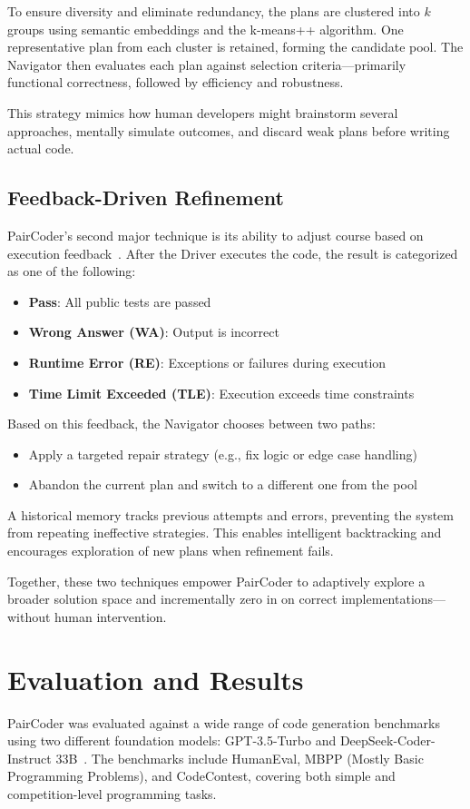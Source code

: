 \documentclass[11pt,a4paper]{article}
\begin{document}
To ensure diversity and eliminate redundancy, the plans are clustered into $k$ groups using semantic embeddings and the k-means++ algorithm. One representative plan from each cluster is retained, forming the candidate pool. The Navigator then evaluates each plan against selection criteria—primarily functional correctness, followed by efficiency and robustness.

This strategy mimics how human developers might brainstorm several approaches, mentally simulate outcomes, and discard weak plans before writing actual code.

\subsection{Feedback-Driven Refinement}
PairCoder’s second major technique is its ability to adjust course based on execution feedback~\cite{zhang2024paircoder}. After the Driver executes the code, the result is categorized as one of the following:
\begin{itemize}
\item \textbf{Pass}: All public tests are passed
\item \textbf{Wrong Answer (WA)}: Output is incorrect
\item \textbf{Runtime Error (RE)}: Exceptions or failures during execution
\item \textbf{Time Limit Exceeded (TLE)}: Execution exceeds time constraints
\end{itemize}

Based on this feedback, the Navigator chooses between two paths:
\begin{itemize}
\item Apply a targeted repair strategy (e.g., fix logic or edge case handling)
\item Abandon the current plan and switch to a different one from the pool
\end{itemize}

A historical memory tracks previous attempts and errors, preventing the system from repeating ineffective strategies. This enables intelligent backtracking and encourages exploration of new plans when refinement fails.

Together, these two techniques empower PairCoder to adaptively explore a broader solution space and incrementally zero in on correct implementations—without human intervention.
\section{Evaluation and Results}
PairCoder was evaluated against a wide range of code generation benchmarks using two different foundation models: GPT-3.5-Turbo and DeepSeek-Coder-Instruct 33B~\cite{zhang2024paircoder}. The benchmarks include HumanEval, MBPP (Mostly Basic Programming Problems), and CodeContest, covering both simple and competition-level programming tasks.
\end{document}
